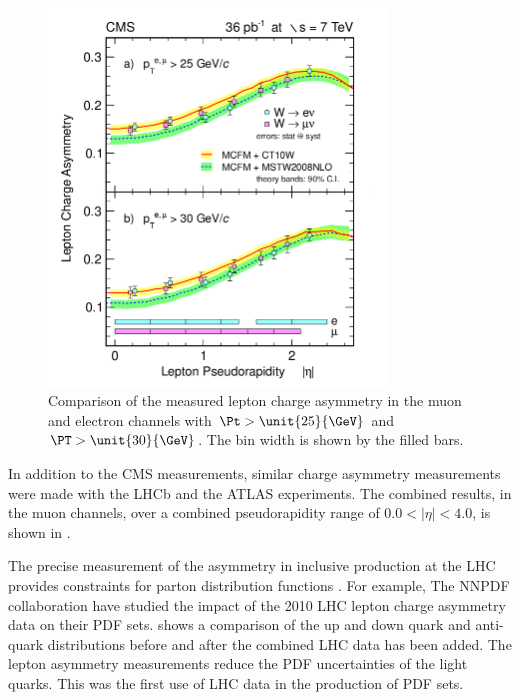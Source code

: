 \begin{figure}[htbp]
  \begin{center}
  \includegraphics*[width=0.8\textwidth]{combined}
  \caption[Comparison of the measured lepton charge asymmetry in the muon and
electron channels] { Comparison of the measured lepton charge asymmetry in the
muon and electron channels with $\Pt>\unit{25}{\GeV}$ and $\PT>\unit{30}{\GeV}$.
The bin width is shown by the filled bars\cite{asym36}.}
  \label{fig:combined}
  \end{center}
\end{figure}

In addition to the CMS measurements, similar charge asymmetry measurements were
made with the LHCb and the ATLAS experiments. The combined results, in the muon
channels, over a combined pseudorapidity range of $0.0 < |\eta | < 4.0$, is
shown in \FigureRef{}.

The precise measurement of the asymmetry in inclusive \PW production at the LHC
provides constraints for parton distribution functions \cite{asym840}.  For
example, The NNPDF collaboration \cite{Lionetti:2011pw} have studied the impact
of the 2010 LHC \PW lepton charge asymmetry data on their PDF sets\cite{Ball:2011gg}.
 shows a comparison of the up and down quark and
anti-quark distributions before and after the combined LHC data has been
added\cite{Ball:2011gg}.  The lepton asymmetry measurements reduce the PDF
uncertainties of the light quarks. This was the first use of LHC data in
the production of PDF sets. 

